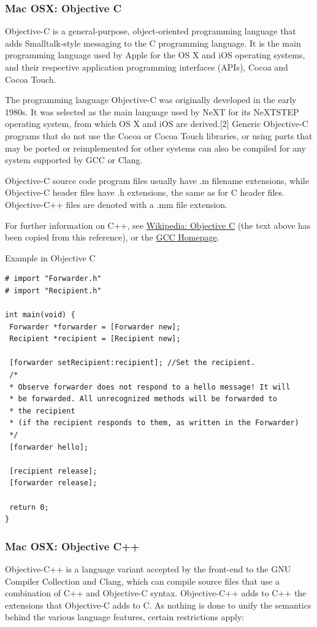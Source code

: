 \newpage
\subsubsection{Mac OSX: Objective C}
Objective-C is a general-purpose, object-oriented programming language that adds Smalltalk-style messaging to the C programming language. It is the main programming language used by Apple for the OS X and iOS operating systems, and their respective application programming interfaces (APIs), Cocoa and Cocoa Touch.

\vpara
The programming language Objective-C was originally developed in the early 1980s. It was selected as the main language used by NeXT for its NeXTSTEP operating system, from which OS X and iOS are derived.[2] Generic Objective-C programs that do not use the Cocoa or Cocoa Touch libraries, or using parts that may be ported or reimplemented for other systems can also be compiled for any system supported by GCC or Clang.

\vpara
Objective-C source code program files usually have .m filename extensions, while Objective-C header files have .h extensions, the same as for C header files. Objective-C++ files are denoted with a .mm file extension.


\vpara
For further information on C++, see \href{http://en.wikipedia.org/wiki/Objective-C}{Wikipedia: Objective C} (the text above has been copied from this reference), or the  \href{http://gcc.gnu.org/}{GCC Homepage}.



\vpara
Example in Objective C

\begin{lstlisting}
# import "Forwarder.h"
# import "Recipient.h"
 
int main(void) {
 Forwarder *forwarder = [Forwarder new];
 Recipient *recipient = [Recipient new];
 
 [forwarder setRecipient:recipient]; //Set the recipient.
 /*
 * Observe forwarder does not respond to a hello message! It will
 * be forwarded. All unrecognized methods will be forwarded to
 * the recipient
 * (if the recipient responds to them, as written in the Forwarder)
 */
 [forwarder hello];
 
 [recipient release];
 [forwarder release];
 
 return 0;
}
\end{lstlisting}




\newpage
\subsubsection{Mac OSX: Objective C++}
Objective-C++ is a language variant accepted by the front-end to the GNU Compiler Collection and Clang, which can compile source files that use a combination of C++ and Objective-C syntax. Objective-C++ adds to C++ the extensions that Objective-C adds to C. As nothing is done to unify the semantics behind the various language features, certain restrictions apply:

